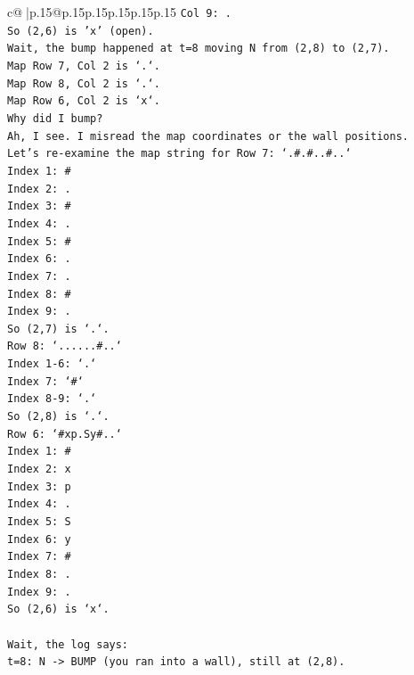 \documentclass{article}
\begin{document}
{\begin{supertabular}{c@{$\;$}|p{.15\linewidth}@{}p{.15\linewidth}p{.15\linewidth}p{.15\linewidth}p{.15\linewidth}p{.15\linewidth}}
{{{\texttt{Col 9: .} \\
\texttt{So (2,6) is 'x' (open).} \\
\texttt{Wait, the bump happened at t=8 moving N from (2,8) to (2,7).} \\
\texttt{Map Row 7, Col 2 is `.`.} \\
\texttt{Map Row 8, Col 2 is `.`.} \\
\texttt{Map Row 6, Col 2 is `x`.} \\
\texttt{Why did I bump?} \\
\texttt{Ah, I see. I misread the map coordinates or the wall positions.} \\
\texttt{Let's re{-}examine the map string for Row 7: `.\#.\#..\#..`} \\
\texttt{Index 1: \#} \\
\texttt{Index 2: .} \\
\texttt{Index 3: \#} \\
\texttt{Index 4: .} \\
\texttt{Index 5: \#} \\
\texttt{Index 6: .} \\
\texttt{Index 7: .} \\
\texttt{Index 8: \#} \\
\texttt{Index 9: .} \\
\texttt{So (2,7) is `.`.} \\
\texttt{Row 8: `......\#..`} \\
\texttt{Index 1{-}6: `.`} \\
\texttt{Index 7: `\#`} \\
\texttt{Index 8{-}9: `.`} \\
\texttt{So (2,8) is `.`.} \\
\texttt{Row 6: `\#xp.Sy\#..`} \\
\texttt{Index 1: \#} \\
\texttt{Index 2: x} \\
\texttt{Index 3: p} \\
\texttt{Index 4: .} \\
\texttt{Index 5: S} \\
\texttt{Index 6: y} \\
\texttt{Index 7: \#} \\
\texttt{Index 8: .} \\
\texttt{Index 9: .} \\
\texttt{So (2,6) is `x`.} \\
\\ 
\texttt{Wait, the log says:} \\
\texttt{t=8: N {-}> BUMP (you ran into a wall), still at (2,8).} \\
}}}
\end{supertabular}}
\end{document}
